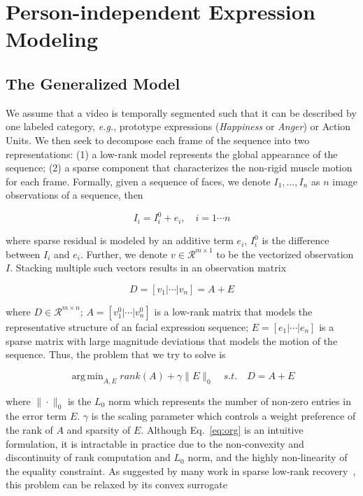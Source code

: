 \documentclass[journal]{IEEEtran}
\DeclareMathOperator*{\argmin}{arg\,min}
\begin{document}
\section{Person-independent Expression Modeling\label{sec:decompose}}

\subsection{The Generalized Model} 
We assume that a video is temporally segmented such that it can be described by one labeled category, \textit{e.g.}, prototype expressions (\textit{Happiness} or \textit{Anger}) or Action Units. We then seek to decompose each frame of the sequence into two representations: (1) a low-rank model represents the global appearance of the sequence; (2) a sparse component that characterizes the non-rigid muscle motion for each frame. Formally, given a sequence of faces, we denote $I_1, \ldots, I_n$ as $n$ image observations of a sequence, then

\begin{equation}
I_i = I^{0}_i + e_i,\quad i = 1\cdots n
\end{equation}

\noindent where sparse residual is modeled by an additive term $e_i$, $I^{0}_i$ is the difference between $I_i$ and $e_i$. Further, we denote $v\in\mathscr{R}^{m\times 1}$ to be the vectorized observation $I$. Stacking multiple such vectors results in an observation matrix

\begin{equation}
D = [v_1 | \cdots | v_n] = A + E
\end{equation}

\noindent where $D\in\mathscr{R}^{m\times n}$; $A = [v^{0}_{1} | \cdots | v^{0}_{n}]$ is a low-rank matrix that models the representative structure of an facial expression sequence; $E = [e_{1} | \cdots | e_{n}]$ is a sparse matrix with large magnitude deviations that models the motion of the sequence. Thus, the problem that we try to solve is

\begin{equation} \label{eq:org}
\argmin_{A,E} rank(A)+\gamma \|E\|_0  \quad s.t. \quad D = A + E 
\end{equation}

\noindent where $\|\cdot\|_0$ is the $L_0$ norm which represents the number of non-zero entries in the error term $E$. $\gamma$ is the scaling parameter which controls a weight preference of the rank of $A$ and sparsity of $E$. Although Eq.~\ref{eq:org} is an intuitive formulation, it is intractable in practice due to the non-convexity and discontinuity of rank computation and $L_0$ norm, and the highly non-linearity of the equality constraint. As suggested by many work in sparse low-rank recovery~\cite{Candes11,Lin09,Peng_CVPR10}, this problem can be relaxed by its convex surrogate
\end{document}
